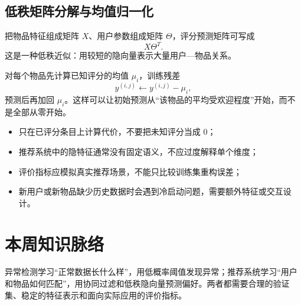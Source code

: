 \subsection{低秩矩阵分解与均值归一化}
\begin{tipbox}[向量化预测]
把物品特征组成矩阵 $X$、用户参数组成矩阵 $\Theta$，评分预测矩阵可写成
\[
X\Theta^T.
\]
这是一种低秩近似：用较短的隐向量表示大量用户—物品关系。
\end{tipbox}
\begin{definitionbox}[均值归一化]
对每个物品先计算已知评分的均值 $\mu_i$，训练残差
\[
y^{(i,j)}\leftarrow y^{(i,j)}-\mu_i,
\]
预测后再加回 $\mu_i$。这样可以让初始预测从“该物品的平均受欢迎程度”开始，而不是全部从零开始。
\end{definitionbox}
\begin{mistakebox}[推荐系统的注意事项]
\begin{itemize}
  \item 只在已评分条目上计算代价，不要把未知评分当成 $0$；
  \item 推荐系统中的隐特征通常没有固定语义，不应过度解释单个维度；
  \item 评价指标应模拟真实推荐场景，不能只比较训练集重构误差；
  \item 新用户或新物品缺少历史数据时会遇到冷启动问题，需要额外特征或交互设计。
\end{itemize}
\end{mistakebox}

\section{本周知识脉络}
\begin{keybox}[概率模型与隐变量表示]
异常检测学习“正常数据长什么样”，用低概率阈值发现异常；推荐系统学习“用户和物品如何匹配”，用协同过滤和低秩隐向量预测偏好。两者都需要合理的验证集、稳定的特征表示和面向实际应用的评价指标。
\end{keybox}

